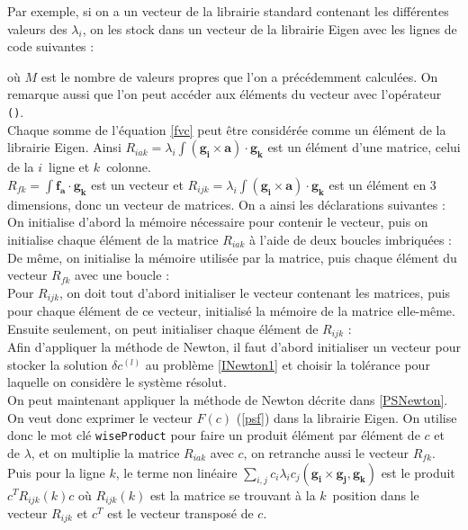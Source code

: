 Par exemple, si on a un vecteur de la librairie standard contenant les différentes valeurs des $\lambda_i$, on les stock dans un vecteur de la librairie Eigen avec les lignes de code suivantes : 

où $M$ est le nombre de valeurs propres que l'on a précédemment calculées. On remarque aussi que l'on peut accéder aux éléments du vecteur avec l'opérateur \texttt{()}.\\

Chaque somme de l'équation \ref{fvc} peut être considérée comme un élément de la librairie Eigen. Ainsi $R_{iak}=\lambda_i\int (\bm{g_i}\times\bm{a})\cdot\bm{g_k}$ est un élément d'une matrice, celui de la $i$\ieme\ ligne et $k$\ieme\ colonne.\\
$R_{fk} = \int \bm{f_a}\cdot\bm{g_k}$ est un vecteur et $R_{ijk} = \lambda_i\int (\bm{g_i}\times\bm{a})\cdot\bm{g_k}$ est un élément en 3 dimensions, donc un vecteur de matrices. On a ainsi les déclarations suivantes :\\


On initialise d'abord la mémoire nécessaire pour contenir le vecteur, puis on initialise chaque élément de la matrice $R_{iak}$ à l'aide de deux boucles imbriquées :\\


De même, on initialise la mémoire utilisée par la matrice, puis chaque élément du vecteur $R_{fk}$ avec une boucle :\\


Pour $R_{ijk}$, on doit tout d'abord initialiser le vecteur contenant les matrices, puis pour chaque élément de ce vecteur, initialisé la mémoire de la matrice elle-même. Ensuite seulement, on peut initialiser chaque élément de $R_{ijk}$ :\\


Afin d'appliquer la méthode de Newton, il faut d'abord initialiser un vecteur pour stocker la solution $\delta c^{(l)}$ au problème \ref{INewton1} et choisir la tolérance pour laquelle on considère le système résolut.\\


On peut maintenant appliquer la méthode de Newton décrite dans \ref{PSNewton}. On veut donc exprimer le vecteur $F(c)$ (\ref{psf}) dans la librairie Eigen. On utilise donc le mot clé \texttt{wiseProduct} pour faire un produit élément par élément de $c$ et de $\lambda$, et on multiplie la matrice $R_{iak}$ avec $c$, on retranche aussi le vecteur $R_{fk}$.\\
Puis pour la ligne $k$, le terme non linéaire $\sum_{i,j} c_i\lambda_i c_j (\mathbf{g_i}\times \mathbf{g_j}, \mathbf{g_k})$ est le produit $c^TR_{ijk}(k)c$ où $R_{ijk}(k)$ est la matrice se trouvant à la $k$\ieme\ position dans le vecteur $R_{ijk}$ et $c^T$ est le vecteur transposé de $c$.\\


